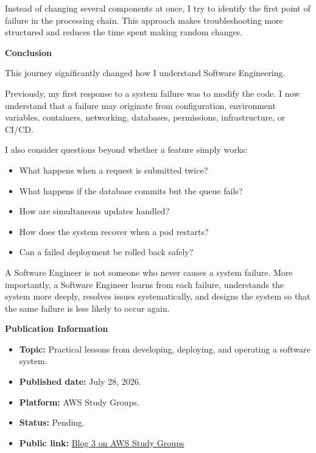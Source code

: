 Instead of changing several components at once, I try to identify the
first point of failure in the processing chain. This approach makes
troubleshooting more structured and reduces the time spent making random
changes.

\vspace{0.5em}\noindent\textbf{Conclusion}\par

This journey significantly changed how I understand Software
Engineering.

Previously, my first response to a system failure was to modify the
code. I now understand that a failure may originate from configuration,
environment variables, containers, networking, databases, permissions,
infrastructure, or CI/CD.

I also consider questions beyond whether a feature simply works:

\begin{itemize}
\tightlist
\item
  What happens when a request is submitted twice?
\item
  What happens if the database commits but the queue fails?
\item
  How are simultaneous updates handled?
\item
  How does the system recover when a pod restarts?
\item
  Can a failed deployment be rolled back safely?
\end{itemize}

A Software Engineer is not someone who never causes a system failure.
More importantly, a Software Engineer learns from each failure,
understands the system more deeply, resolves issues systematically, and
designs the system so that the same failure is less likely to occur
again.

\vspace{0.5em}\noindent\textbf{Publication Information}\par

\begin{itemize}
\tightlist
\item
  \textbf{Topic:} Practical lessons from developing, deploying, and
  operating a software system.
\item
  \textbf{Published date:} July 28, 2026.
\item
  \textbf{Platform:} AWS Study Groups.
\item
  \textbf{Status:} Pending.
\item
  \textbf{Public link:}
  \href{https://www.facebook.com/groups/awsstudygroupfcj/permalink/2227122848052675/\#}{Blog
  3 on AWS Study Groups}
\end{itemize}

